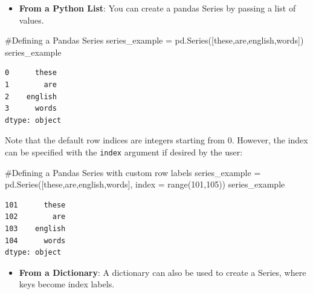 \documentclass[
  letterpaper,
  DIV=11,
  numbers=noendperiod]{scrreprt}
\newenvironment{Shaded}{\begin{snugshade}}{\end{snugshade}}
\newcommand{\BuiltInTok}[1]{\textcolor[rgb]{0.00,0.23,0.31}{#1}}
\newcommand{\CommentTok}[1]{\textcolor[rgb]{0.37,0.37,0.37}{#1}}
\newcommand{\DecValTok}[1]{\textcolor[rgb]{0.68,0.00,0.00}{#1}}
\newcommand{\NormalTok}[1]{\textcolor[rgb]{0.00,0.23,0.31}{#1}}
\newcommand{\OperatorTok}[1]{\textcolor[rgb]{0.37,0.37,0.37}{#1}}
\newcommand{\StringTok}[1]{\textcolor[rgb]{0.13,0.47,0.30}{#1}}
\providecommand{\tightlist}{%
  \setlength{\itemsep}{0pt}\setlength{\parskip}{0pt}}\usepackage{longtable,booktabs,array}
\begin{document}
\begin{itemize}
\tightlist
\item
  \textbf{From a Python List}: You can create a pandas Series by passing
  a list of values.
\end{itemize}

\begin{Shaded}
\begin{Highlighting}[]
\CommentTok{\#Defining a Pandas Series}
\NormalTok{series\_example }\OperatorTok{=}\NormalTok{ pd.Series([}\StringTok{\textquotesingle{}these\textquotesingle{}}\NormalTok{,}\StringTok{\textquotesingle{}are\textquotesingle{}}\NormalTok{,}\StringTok{\textquotesingle{}english\textquotesingle{}}\NormalTok{,}\StringTok{\textquotesingle{}words\textquotesingle{}}\NormalTok{])}
\NormalTok{series\_example}
\end{Highlighting}
\end{Shaded}

\begin{verbatim}
0      these
1        are
2    english
3      words
dtype: object
\end{verbatim}

Note that the default row indices are integers starting from 0. However,
the index can be specified with the \texttt{index} argument if desired
by the user:

\begin{Shaded}
\begin{Highlighting}[]
\CommentTok{\#Defining a Pandas Series with custom row labels}
\NormalTok{series\_example }\OperatorTok{=}\NormalTok{ pd.Series([}\StringTok{\textquotesingle{}these\textquotesingle{}}\NormalTok{,}\StringTok{\textquotesingle{}are\textquotesingle{}}\NormalTok{,}\StringTok{\textquotesingle{}english\textquotesingle{}}\NormalTok{,}\StringTok{\textquotesingle{}words\textquotesingle{}}\NormalTok{], index }\OperatorTok{=} \BuiltInTok{range}\NormalTok{(}\DecValTok{101}\NormalTok{,}\DecValTok{105}\NormalTok{))}
\NormalTok{series\_example}
\end{Highlighting}
\end{Shaded}

\begin{verbatim}
101      these
102        are
103    english
104      words
dtype: object
\end{verbatim}

\begin{itemize}
\tightlist
\item
  \textbf{From a Dictionary}: A dictionary can also be used to create a
  Series, where keys become index labels.
\end{itemize}
\end{document}
